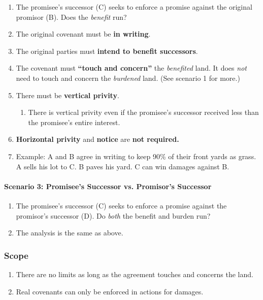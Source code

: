\begin{enumerate}
    \item The promisee's successor (C) seeks to enforce a promise against the 
    original promisor (B). Does the \emph{benefit} run?
    \item The original covenant must be \textbf{in writing}.
    \item The original parties must \textbf{intend to benefit successors}.
    \item The covenant must \textbf{``touch and concern''} the 
    \emph{benefited} land. It does \emph{not} need to touch and concern the 
    \emph{burdened} land. (See scenario 1 for more.)
    \item There must be \textbf{vertical privity}.
    \begin{enumerate}
        \item There is vertical privity even if the promisee's successor 
        received less than the promisee's entire interest.
    \end{enumerate}
    \item \textbf{Horizontal privity} and \textbf{notice} are \textbf{not 
    required.}
    \item Example: A and B agree in writing to keep 90\% of their front yards 
    as grass. A sells his lot to C. B paves his yard. C can win damages 
    against B.
\end{enumerate}

\paragraph{Scenario 3: Promisee's Successor vs. Promisor's Successor}

\begin{enumerate}
    \item The promisee's successor (C) seeks to enforce a promise against the 
    promisor's successor (D). Do \emph{both} the benefit and burden run?
    \item The analysis is the same as above.
\end{enumerate}

\subsubsection{Scope}

\begin{enumerate}
    \item There are no limits as long as the agreement touches and concerns 
    the land.
    \item Real covenants can only be enforced in actions for damages.
\end{enumerate}

